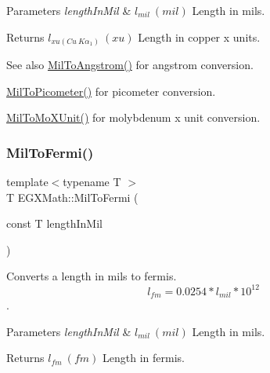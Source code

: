 \begin{DoxyParams}{Parameters}
{\em length\+In\+Mil} & $ l_{mil}\ (mil)$ Length in mils. \\
\hline
\end{DoxyParams}
\begin{DoxyReturn}{Returns}
$ l_{xu(Cu\ K\alpha_1)}\ (xu)$ Length in copper x units. 
\end{DoxyReturn}
\begin{DoxySeeAlso}{See also}
\mbox{\hyperlink{group___e_g_x_math-_conversions-_length_conversions-_imperial-_mil-_non-_s_i_gad209d1b047ce810b8879b9ea1ff4a5a5}{Mil\+To\+Angstrom()}} for angstrom conversion. 

\mbox{\hyperlink{group___e_g_x_math-_conversions-_length_conversions-_imperial-_mil-_s_i_ga29a85f8ec2e5cf4d963468f882de8447}{Mil\+To\+Picometer()}} for picometer conversion. 

\mbox{\hyperlink{group___e_g_x_math-_conversions-_length_conversions-_imperial-_mil-_non-_s_i_ga673efde012cc982641b2eb1266f88f3a}{Mil\+To\+Mo\+X\+Unit()}} for molybdenum x unit conversion. 
\end{DoxySeeAlso}
\mbox{\label{group___e_g_x_math-_conversions-_length_conversions-_imperial-_mil-_non-_s_i_ga713363db9840eea0ed836b1d47cc0b6c}} 
\subsubsection{\texorpdfstring{Mil\+To\+Fermi()}{MilToFermi()}}
{\footnotesize\ttfamily template$<$typename T $>$ \\
T E\+G\+X\+Math\+::\+Mil\+To\+Fermi (\begin{DoxyParamCaption}\item[{const T}]{length\+In\+Mil }\end{DoxyParamCaption})}



Converts a length in mils to fermis. \[ l_{fm}=0.0254 * l_{mil} * 10^{12} \]. 


\begin{DoxyParams}{Parameters}
{\em length\+In\+Mil} & $ l_{mil}\ (mil)$ Length in mils. \\
\hline
\end{DoxyParams}
\begin{DoxyReturn}{Returns}
$ l_{fm}\ (fm)$ Length in fermis. 
\end{DoxyReturn}
\mbox{\label{group___e_g_x_math-_conversions-_length_conversions-_imperial-_mil-_non-_s_i_gab38b772b1b070729756dcdc87826f5d0}} 
